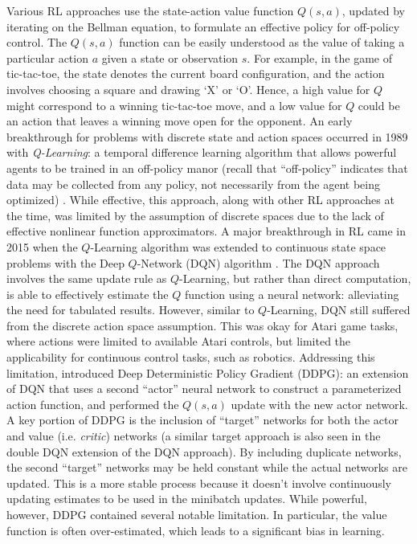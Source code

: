 \documentclass{article}
\begin{document}
Various RL approaches use the state-action value function $Q(s,a)$,  updated by iterating on the Bellman equation, to formulate an effective policy for off-policy control. The $Q(s,a)$ function can be easily understood as the value of taking a particular action $a$ given a state or observation $s$. For example, in the game of tic-tac-toe, the state denotes the current board configuration, and the action involves choosing a square and drawing `X' or `O'. Hence, a high value for $Q$ might correspond to a winning tic-tac-toe move, and a low value for $Q$ could be an action that leaves a winning move open for the opponent. An early breakthrough for problems with discrete state and action spaces occurred in 1989 with \textit{Q-Learning}: a temporal difference learning algorithm that allows powerful agents to be trained in an off-policy manor (recall that ``off-policy'' indicates that data may be collected from any policy, not necessarily from the agent being optimized) \citep{textbook}. While effective, this approach, along with other RL approaches at the time, was limited by the assumption of discrete spaces due to the lack of effective nonlinear function approximators. A major breakthrough in RL came in 2015 when the $Q$-Learning algorithm was extended to continuous state space problems with the Deep $Q$-Network (DQN) algorithm \citep{dqn}. The DQN approach involves the same update rule as $Q$-Learning, but rather than direct computation, is able to effectively estimate the $Q$ function using a neural network: alleviating the need for tabulated results. However, similar to $Q$-Learning, DQN still suffered from the discrete action space assumption. This was okay for Atari game tasks, where actions were limited to available Atari controls, but limited the applicability for continuous control tasks, such as robotics. Addressing this limitation, \citep{ddpg} introduced Deep Deterministic Policy Gradient (DDPG): an extension of DQN that uses a second ``actor'' neural network to construct a parameterized action function, and performed the $Q(s,a)$ update with the new actor network. A key portion of DDPG is the inclusion of ``target'' networks for both the actor and value (i.e. \textit{critic}) networks (a similar target approach is also seen in the double DQN extension of the DQN approach). By including duplicate networks, the second ``target'' networks may be held constant while the actual networks are updated. This is a more stable process because it doesn't involve continuously updating estimates to be used in the minibatch updates. While powerful, however, DDPG contained several notable limitation. In particular, the value function is often over-estimated, which leads to a significant bias in learning.
\end{document}
